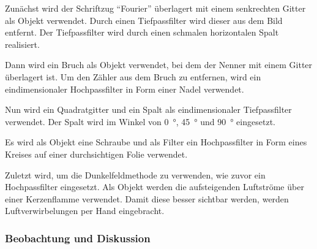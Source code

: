 \documentclass[
	a4paper,
	12pt,
	pagesize,
	ngerman
]{scrartcl}
\begin{document}
		Zunächst wird der Schriftzug \enquote{Fourier} überlagert mit einem senkrechten Gitter als Objekt verwendet.
		Durch einen Tiefpassfilter wird dieser aus dem Bild entfernt.
		Der Tiefpassfilter wird durch einen schmalen horizontalen Spalt realisiert.

		Dann wird ein Bruch als Objekt verwendet, bei dem der Nenner mit einem Gitter überlagert ist.
		Um den Zähler aus dem Bruch zu entfernen, wird ein eindimensionaler Hochpassfilter in Form einer Nadel verwendet.

		Nun wird ein Quadratgitter und ein Spalt als eindimensionaler Tiefpassfilter verwendet.
		Der Spalt wird im Winkel von \SI{0}{\degree}, \SI{45}{\degree} und \SI{90}{\degree} eingesetzt.

		Es wird als Objekt eine Schraube und als Filter ein Hochpassfilter in Form eines Kreises auf einer durchsichtigen Folie verwendet.

		Zuletzt wird, um die Dunkelfeldmethode zu verwenden, wie zuvor ein Hochpassfilter eingesetzt.
		Als Objekt werden die aufsteigenden Luftströme über einer Kerzenflamme verwendet.
		Damit diese besser sichtbar werden, werden Luftverwirbelungen per Hand eingebracht.

	\subsubsection*{Beobachtung und Diskussion}
\end{document}
